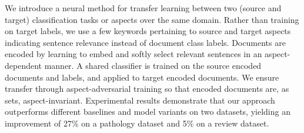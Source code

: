We introduce a neural method for transfer learning between two (source and target) classification tasks or aspects over the same domain. Rather than training on target labels, we use a few keywords pertaining to source and target aspects indicating sentence relevance instead of document class labels. Documents are encoded by learning to embed and softly select relevant sentences in an aspect-dependent manner. A shared classifier is trained on the source encoded documents and labels, and applied to target encoded documents. We ensure transfer through aspect-adversarial training so that encoded documents are, as sets, aspect-invariant.  Experimental results demonstrate that our approach outperforms different baselines and model variants on two datasets, yielding an improvement of 27\% on a pathology dataset and 5\% on a review dataset.
